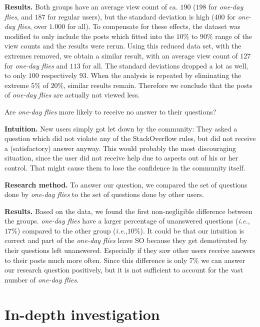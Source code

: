 \documentclass[conference]{IEEEtran}
\newcommand{\ie}{\emph{i.e.},\xspace}
\newcommand\odf{\emph{one-day flies}\xspace}
\begin{document}
\textbf{Results.} Both groups have an average view count of ca. $190$ ($198$
for \odf, and $187$ for regular users), but the standard deviation is high
($400$ for \odf, over $1.000$ for all). To compensate for these
effects, the dataset was modified to only include the posts which fitted into
the $10\%$ to $90\%$ range of the view counts and the results were rerun.
Using this reduced data set, with the extremes removed, we obtain a similar
result, with an average view count of $127$ for \odf and $113$ for all. The standard deviations dropped a lot as well, to only $100$
respectively $93$. When the analysis is repeated by eliminating the extreme
$5\%$ of $20\%$, similar results remain. Therefore we conclude that the posts
of \odf are actually not viewed less.\\


\begin{tcolorbox}[size=fbox,title=RQ5: Unanswered Questions]
Are \odf more likely to receive no answer to their questions?
\end{tcolorbox}

\textbf{Intuition.} New users simply got let down by the community: They asked
a question which did not violate any of the StackOverflow rules, but did not
receive a (satisfactory) answer anyway. This would probably the most
discouraging situation, since the user did not receive help due to aspects out
of his or her control. That might cause them to lose the confidence in the
community itself. 
 
\textbf{Research method.} To answer our question, we compared the set of
questions done by \odf to the set of questions done by other users.

\textbf{Results.} Based on the data, we found the first non-negligible
difference between the groups. \odf have a larger percentage of unanswered
questions (\ie $17\%$) compared to the other group (\ie $10\%$). It could be
that our intuition is correct and part of the \odf leave SO because they get
demotivated by their questions left unanswered. Especially if they saw other
users receive answers to their posts much more often. Since this difference 
is only 7\% we can answer our research question
positively, but it is not sufficient to account for the vast number of \odf.



\section{In-depth investigation}\label{QualitativeResearch}
\end{document}
